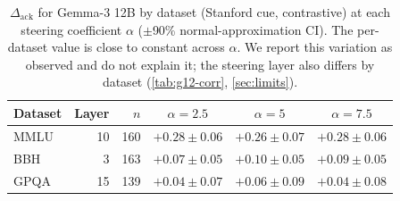 \begin{table}[H]
    \centering\small
    \caption{$\Delta_{\mathrm{ack}}$ for Gemma-3 12B by dataset (Stanford cue,
    contrastive) at each steering coefficient $\alpha$ ($\pm$90\% normal-approximation CI).
    The per-dataset value is close to constant across $\alpha$. We report
    this variation as observed and do not explain it; the steering layer also differs by
    dataset (\cref{tab:g12-corr}, \cref{sec:limits}).}
    \label{tab:g12-alpha}
    \begin{tabular}{@{}l r r ccc@{}}
        \toprule
        Dataset & Layer & $n$ & $\alpha{=}2.5$ & $\alpha{=}5$ & $\alpha{=}7.5$ \\
        \midrule
        MMLU & 10 & 160 & $+0.28{\pm}0.06$ & $+0.26{\pm}0.07$ & $+0.28{\pm}0.06$ \\
        BBH & 3 & 163 & $+0.07{\pm}0.05$ & $+0.10{\pm}0.05$ & $+0.09{\pm}0.05$ \\
        GPQA & 15 & 139 & $+0.04{\pm}0.07$ & $+0.06{\pm}0.09$ & $+0.04{\pm}0.08$ \\
        \bottomrule
    \end{tabular}
\end{table}
